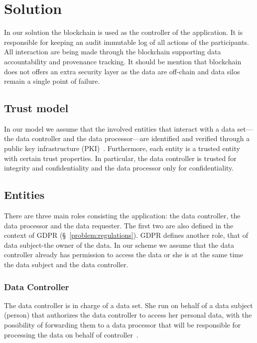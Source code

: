 \chapter{Solution}
\label{solution}

In our solution the blockchain is used as the controller of the application. It is responsible for keeping an
audit immutable log of all actions of the participants. All interaction are being made
through the blockchain supporting data accountability and provenance tracking. It should be mention that blockchain does not offers an extra security layer as the data are off-chain and data silos remain a single point of failure.

\section{Trust model}
\label{solution:trust_model}

In our model we assume that the involved entities that interact with a data set---the data controller and the data processor---are identified and verified through a public key infrastructure (PKI)~\cite{adams_understanding_2003}. Furthermore, each entity is a trusted entity with certain trust properties. In particular, the data controller is trusted for integrity and confidentiality and the data processor only for confidentiality.

\section{Entities}
\label{solution:entities}

There are three main roles consisting the application: the data controller, the data processor
and the data requester. The first two are also defined in the context of GDPR (§~\ref{problem:regulations}).
GDPR defines another role, that of data subject-the owner of the data.
In our scheme we assume that the data controller already has permission to access the data or
she is at the same time the data subject and the data controller.

\subsection{Data Controller}
\label{solution:entities:data_controller}

The data controller is in charge of a data set. She run on behalf of a data subject (person)
that authorizes the data controller to access her personal data, with the possibility of forwarding
them to a data processor that will be responsible for processing the data on behalf of controller~\cite{DBLP:journals/corr/NeisseSF17}.

